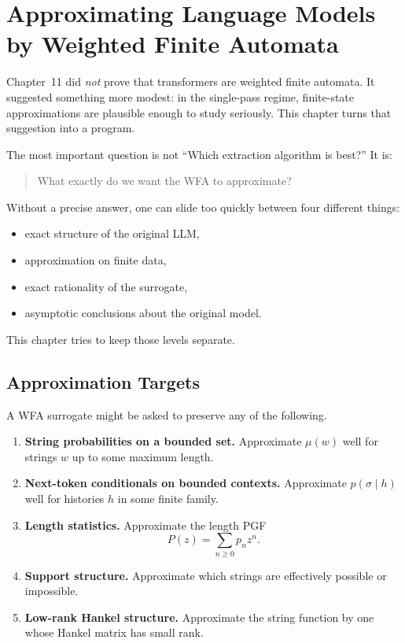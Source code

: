 \chapter[Approximating LLMs by WFAs]{Approximating Language Models by Weighted Finite Automata}
\label{ch12:top}

Chapter~11 did \emph{not} prove that transformers are weighted finite automata. It suggested something more modest: in the single-pass regime, finite-state approximations are plausible enough to study seriously. This chapter turns that suggestion into a program.

The most important question is not ``Which extraction algorithm is best?'' It is:
\begin{quote}
What exactly do we want the WFA to approximate?
\end{quote}
Without a precise answer, one can slide too quickly between four different things:
\begin{itemize}
  \item exact structure of the original LLM,
  \item approximation on finite data,
  \item exact rationality of the surrogate,
  \item asymptotic conclusions about the original model.
\end{itemize}
This chapter tries to keep those levels separate.

\section{Approximation Targets}

A WFA surrogate might be asked to preserve any of the following.
\begin{enumerate}
  \item \textbf{String probabilities on a bounded set.} Approximate $\mu(w)$ well for strings $w$ up to some maximum length.
  \item \textbf{Next-token conditionals on bounded contexts.} Approximate $p(\sigma \mid h)$ well for histories $h$ in some finite family.
  \item \textbf{Length statistics.} Approximate the length PGF
  \[
    P(z)=\sum_{n \ge 0} p_n z^n.
  \]
  \item \textbf{Support structure.} Approximate which strings are effectively possible or impossible.
  \item \textbf{Low-rank Hankel structure.} Approximate the string function by one whose Hankel matrix has small rank.
\end{enumerate}

